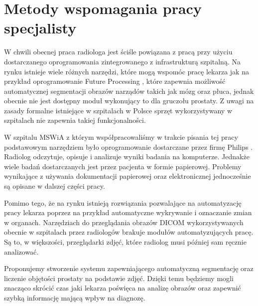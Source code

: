 \documentclass[a4paper,11pt,twoside]{report}
\theoremstyle{definition}
\begin{document}
\section{Metody wspomagania pracy specjalisty}
W chwili obecnej praca radiologa jest ściśle powiązana z pracą przy użyciu dostarczanego oprogramowania zintegrowanego z infrastrukturą szpitalną. Na rynku istnieje wiele różnych narzędzi, które mogą wspomóc pracę lekarza jak na przykład oprogramowanie Future Processing \cite{FP}, które zapewnia możliwość automatycznej segmentacji obrazów narządów takich jak mózg oraz płuca, jednak obecnie nie jest dostępny moduł wykonujący to dla gruczołu prostaty. Z uwagi na zasady formalne istniejące w szpitalach w Polsce sprzęt wykorzystywany w szpitalach nie zapewnia takiej funkcjonalności.
\par
W szpitalu MSWiA z którym współpracowaliśmy w trakcie pisania tej pracy podstawowym narzędziem było oprogramowanie dostarczane przez firmę Philips \cite{Philips}. Radiolog odczytuje, opisuje i analizuje wyniki badania na komputerze. Jednakże wiele badań dostarczanych jest przez pacjenta w formie papierowej. Problemy wynikające z używania dokumentacji papierowej oraz elektronicznej jednocześnie są opisane w dalszej części pracy.
\par
Pomimo tego, że na rynku istnieją rozwiązania pozwalające na automatyzację pracy lekarza poprzez na przykład automatyczne wykrywanie i oznaczanie zmian w organach. Narzędziach do przeglądania obrazów DICOM wykorzystywanych obecnie w szpitalach przez radiologów brakuje modułów automatyzujących pracę. Są to, w większości, przeglądarki zdjęć, które radiolog musi później sam ręcznie analizować. 
\par
Proponujemy stworzenie systemu zapewniającego automatyczną segmentację oraz liczenie objętości prostaty na podstawie zdjęć. Dzięki temu będziemy mogli znacząco skrócić czas jaki lekarza poświęca na analizę obrazów oraz zapewnić szybką informację mającą wpływ na diagnozę.
\end{document}
